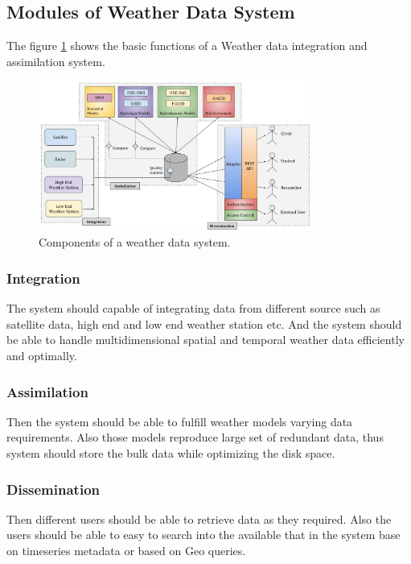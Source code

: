 \subsection{Modules of Weather Data System}
\label{subse:modules_weather_data_integration_sys}

The figure \ref{fi:wdia_components} shows the basic functions of a Weather data integration and assimilation system.
\begin{figure}[htbp]
\centerline{\includegraphics[width=0.8\textwidth]{method/misc/weather_data_system_components.jpg}}
\caption{Components of a weather data system.}
\label{fi:wdia_components}
\end{figure}

\subsubsection{Integration}
The system should capable of integrating data from different source such as satellite data, high end and low end weather station etc. And the system should be able to handle multidimensional spatial and temporal weather data efficiently and optimally. 
\subsubsection{Assimilation}
Then the system should be able to fulfill weather models varying data requirements. Also those models reproduce large set of redundant data, thus system should store the bulk data while optimizing the disk space.
\subsubsection{Dissemination}
Then different users should be able to retrieve data as they required. Also the users should be able to easy to search into the available that in the system base on timeseries metadata or based on Geo queries.

